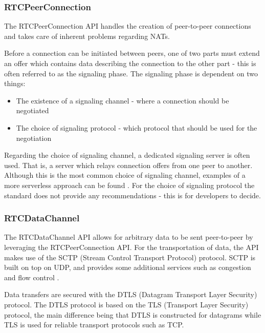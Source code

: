 \subsubsection{RTCPeerConnection}
The RTCPeerConnection API handles the creation of peer-to-peer connections and takes care of inherent problems regarding NATs.

Before a connection can be initiated between peers, one of two parts must extend an offer which contains data describing the connection to the other part - this is often referred to as the signaling phase. The signaling phase is dependent on two things:

\begin{itemize}
  \item The existence of a signaling channel - where a connection should be negotiated
  \item The choice of signaling protocol - which protocol that should be used for the negotiation
\end{itemize}

Regarding the choice of signaling channel, a dedicated signaling server is often used. That is, a server which relays connection offers from one peer to another. Although this is the most common choice of signaling channel, examples of a more serverless approach can be found \cite{webrtcsignalserver}. For the choice of signaling protocol the standard does not provide any recommendations - this is for developers to decide.


\subsubsection{RTCDataChannel}
The RTCDataChannel API allows for arbitrary data to be sent peer-to-peer by leveraging the RTCPeerConnection API. For the transportation of data, the API makes use of the SCTP (Stream Control Transport Protocol) protocol. SCTP is built on top on UDP, and provides some additional services such as congestion and flow control \cite{HighPerfBrowserNetworking:Online}.

Data transfers are secured with the DTLS (Datagram Transport Layer Security) protocol. The DTLS protocol is based on the TLS (Transport Layer Security) protocol, the main difference being that DTLS is constructed for datagrams while TLS is used for reliable transport protocols such as TCP.

